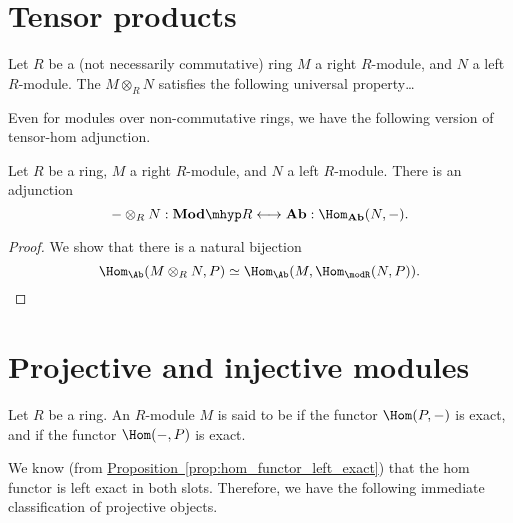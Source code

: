 \documentclass[main.tex]{subfiles}
\begin{document}
\section{Tensor products}
\label{sec:tensor_products}

\begin{definition}
  \label{def:tensor_product}
  Let $R$ be a (not necessarily commutative) ring $M$ a right $R$-module, and $N$ a left $R$-module. The  $M \otimes_{R} N$ satisfies the following universal property\dots
\end{definition}

Even for modules over non-commutative rings, we have the following version of tensor-hom adjunction.
\begin{proposition}
  Let $R$ be a ring, $M$ a right $R$-module, and $N$ a left $R$-module. There is an adjunction
  \begin{equation*}
    - \otimes_{R} N : \mathbf{Mod}\mhyp R \longleftrightarrow \mathbf{Ab} : \Hom_{\mathbf{Ab}}(N, -).
  \end{equation*}
\end{proposition}
\begin{proof}
  We show that there is a natural bijection
  \begin{equation*}
    \Hom_{\Ab}(M \otimes_{R} N, P) \simeq \Hom_{\Ab}(M, \Hom_{\modR}(N, P)).
  \end{equation*}
\end{proof}

\section{Projective and injective modules}
\label{sec:projective_and_injective_modules}

\begin{definition}
  \label{def:projective_injective_module}
  Let $R$ be a ring. An $R$-module $M$ is said to be  if the functor $\Hom(P, -)$ is exact, and  if the functor $\Hom(-, P)$ is exact.
\end{definition}

We know (from \hyperref[prop:hom_functor_left_exact]{Proposition~\ref*{prop:hom_functor_left_exact}}) that the hom functor is left exact in both slots. Therefore, we have the following immediate classification of projective objects.
\end{document}
